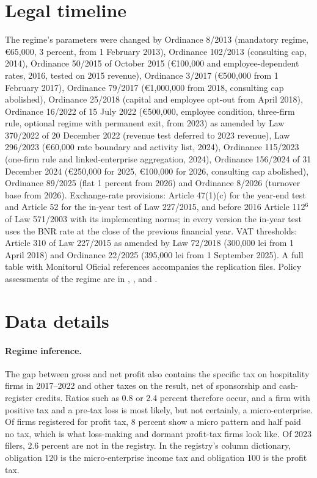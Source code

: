 \documentclass[12pt]{article}
\begin{document}
\clearpage
\appendix
\section{Legal timeline}\label{app:legal}

The regime's parameters were changed by Ordinance 8/2013 (mandatory regime, \euro{}65,000, 3 percent, from 1 February 2013), Ordinance 102/2013 (consulting cap, 2014), Ordinance 50/2015 of October 2015 (\euro{}100,000 and employee-dependent rates, 2016, tested on 2015 revenue), Ordinance 3/2017 (\euro{}500,000 from 1 February 2017), Ordinance 79/2017 (\euro{}1,000,000 from 2018, consulting cap abolished), Ordinance 25/2018 (capital and employee opt-out from April 2018), Ordinance 16/2022 of 15 July 2022 (\euro{}500,000, employee condition, three-firm rule, optional regime with permanent exit, from 2023) as amended by Law 370/2022 of 20 December 2022 (revenue test deferred to 2023 revenue), Law 296/2023 (\euro{}60,000 rate boundary and activity list, 2024), Ordinance 115/2023 (one-firm rule and linked-enterprise aggregation, 2024), Ordinance 156/2024 of 31 December 2024 (\euro{}250,000 for 2025, \euro{}100,000 for 2026, consulting cap abolished), Ordinance 89/2025 (flat 1 percent from 2026) and Ordinance 8/2026 (turnover base from 2026). Exchange-rate provisions: Article 47(1)(c) for the year-end test and Article 52 for the in-year test of Law 227/2015, and before 2016 Article 112$^6$ of Law 571/2003 with its implementing norms; in every version the in-year test uses the BNR rate at the close of the previous financial year. VAT thresholds: Article 310 of Law 227/2015 as amended by Law 72/2018 (300,000 lei from 1 April 2018) and Ordinance 22/2025 (395,000 lei from 1 September 2025). A full table with Monitorul Oficial references accompanies the replication files. Policy assessments of the regime are in \citet{imf2025}, \citet{cf2024}, \citet{ban2023} and \citet{lazar2024}.

\FloatBarrier
\section{Data details}\label{app:data}

\paragraph{Regime inference.} The gap between gross and net profit also contains the specific tax on hospitality firms in 2017--2022 and other taxes on the result, net of sponsorship and cash-register credits. Ratios such as 0.8 or 2.4 percent therefore occur, and a firm with positive tax and a pre-tax loss is most likely, but not certainly, a micro-enterprise. Of firms registered for profit tax, 8 percent show a micro pattern and half paid no tax, which is what loss-making and dormant profit-tax firms look like. Of 2023 filers, 2.6 percent are not in the registry. In the registry's column dictionary, obligation 120 is the micro-enterprise income tax and obligation 100 is the profit tax.
\end{document}
